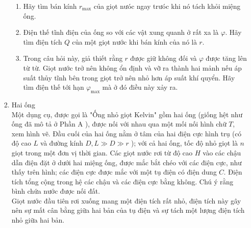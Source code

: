 \begin{vd}
\begin{enumerate}[\bf Phần A.]
\begin{center}
    \end{center}
    \begin{enumerate}[1)]
        \item Hãy tìm bán kính $r_{\max }$ của giọt nưóc ngay trưóc khi nó tách khỏi miệng ống.
        \item Điện thế tĩnh điện của ống so với các vật xung quanh ở rất xa là $\varphi$. Hãy tìm điện tích $Q$ của một giọt nước khi bán kính của nó là $r$.
        \item Trong câu hỏi này, giả thiết rằng $r$ được giữ không đối và $\varphi$ được tăng lên từ từ. Giọt nước trở nên không ổn định và vỡ ra thành hai mảnh nếu áp suất thủy tĩnh bên trong giọt trở nên nhỏ hơn áp suất khí quyển. Hãy tìm điện thế tới hạn $\varphi_{{\max }}$ mà ở đó điều này xảy ra.
    \end{enumerate}
    \item Hai ống\\
    Một dụng cụ, được gọi là "Ống nhỏ giọt Kelvin" gồm hai ống (giống hệt như ống đã mô tả ở Phần $\mathrm{A}$ ), được nối với nhau qua một mối nối hình chữ ${T}$, xem hình vẽ. Đầu cuối của hai ống nằm ở tâm của hai điện cực hình trụ (có độ cao $L$ và đường kính $D, L \gg D \gg r$ ); với cả hai ống, tốc độ nhỏ giọt là $n$ giọt trong một đơn vị thời gian. Các giọt nước rơi từ độ cao $H$ vào các chậu dẫn điện đặt ở dưới hai miệng ống, được mắc bắt chéo với các điện cực, như thấy trên hình; các điện cực được mắc với một tụ điện có điện dung $C$. Điện tích tổng cộng trong hệ các chậu và các điện cực bằng không. Chú ý rằng bình chứa nước được nối đất.\\
    Giọt nước đầu tiên rơi xuống mang một điện tích rất nhỏ, điện tích này gây nên sự mất cân bằng giữa hai bản của tụ điện và sự tách một lượng điện tích nhỏ giữa hai bản.
    \begin{center}
        


\begin{tikzpicture}[x=0.75pt,y=0.75pt,yscale=-1,xscale=1]


\end{tikzpicture}
\end{center}
\end{enumerate}
\end{vd}
